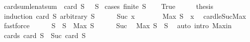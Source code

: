 \begin{isabellebody}
{\isafoldproof}%
%
\isadelimproof
\isanewline
%
\endisadelimproof
\isanewline
{}\isamarkupfalse%
\isanewline
\isanewline
{}\isamarkupfalse%
\ card{\isacharunderscore}{\kern0pt}sum{\isacharunderscore}{\kern0pt}le{\isacharunderscore}{\kern0pt}nat{\isacharunderscore}{\kern0pt}sum{\isacharcolon}{\kern0pt}\ {\isachardoublequoteopen}{\isasymSum}\ {\isacharbraceleft}{\kern0pt}{}{\isachardot}{\kern0pt}{\isachardot}{\kern0pt}{\isacharless}{\kern0pt}card\ S{\isacharbraceright}{\kern0pt}\ {\isasymle}\ {\isasymSum}\ S{\isachardoublequoteclose}\isanewline
%
\isadelimproof
%
\endisadelimproof
%
\isatagproof
{}\isamarkupfalse%
\ {\isacharparenleft}{\kern0pt}cases\ {\isachardoublequoteopen}finite\ S{\isachardoublequoteclose}{\isacharparenright}{\kern0pt}\isanewline
\ \ \isamarkupfalse%
\ True\isanewline
\ \ \isamarkupfalse%
\ \isamarkupfalse%
\ {\isacharquery}{\kern0pt}thesis\isanewline
\ \ \isamarkupfalse%
\ {\isacharparenleft}{\kern0pt}induction\ {\isachardoublequoteopen}card\ S{\isachardoublequoteclose}\ arbitrary{\isacharcolon}{\kern0pt}\ S{\isacharparenright}{\kern0pt}\isanewline
\ \ \ \ \isamarkupfalse%
\ {\isacharparenleft}{\kern0pt}Suc\ x{\isacharparenright}{\kern0pt}\isanewline
\ \ \ \ \isamarkupfalse%
\ \isamarkupfalse%
\ {\isachardoublequoteopen}Max\ S\ {\isasymge}\ x{\isachardoublequoteclose}\ \isamarkupfalse%
\ card{\isacharunderscore}{\kern0pt}le{\isacharunderscore}{\kern0pt}Suc{\isacharunderscore}{\kern0pt}Max\ \isamarkupfalse%
\ fastforce\isanewline
\ \ \ \ \isamarkupfalse%
\ {\isacharquery}{\kern0pt}S{\isacharprime}{\kern0pt}\ {\isacharequal}{\kern0pt}\ {\isachardoublequoteopen}S\ {\isacharminus}{\kern0pt}\ {\isacharbraceleft}{\kern0pt}Max\ S{\isacharbraceright}{\kern0pt}{\isachardoublequoteclose}\isanewline
\ \ \ \ \isamarkupfalse%
\ Suc\ \isamarkupfalse%
\ {\isachardoublequoteopen}Max\ S\ {\isasymin}\ S{\isachardoublequoteclose}\ \isamarkupfalse%
\ {\isacharparenleft}{\kern0pt}auto\ intro{\isacharcolon}{\kern0pt}\ Max{\isacharunderscore}{\kern0pt}in{\isacharparenright}{\kern0pt}\isanewline
\ \ \ \ \isamarkupfalse%
\ cards{\isacharcolon}{\kern0pt}\ {\isachardoublequoteopen}card\ S\ {\isacharequal}{\kern0pt}\ Suc\ {\isacharparenleft}{\kern0pt}card\ {\isacharquery}{\kern0pt}S{\isacharprime}{\kern0pt}{\isacharparenright}{\kern0pt}{\isachardoublequoteclose}\isanewline

\end{isabellebody}
